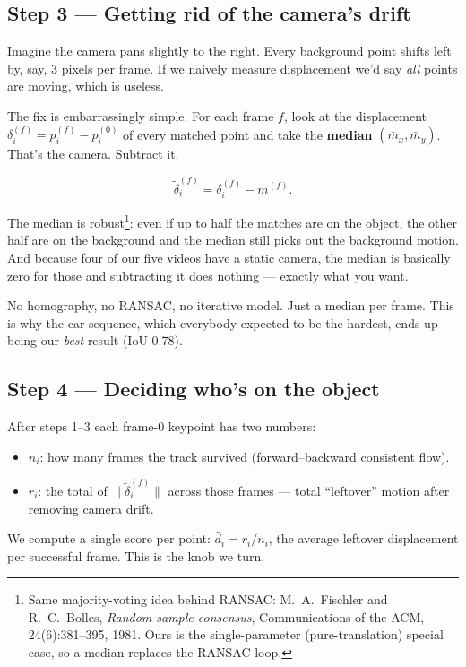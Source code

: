 \documentclass[11pt,a4paper]{article}
\begin{document}
\subsection{Step 3 --- Getting rid of the camera's drift}

Imagine the camera pans slightly to the right. Every background
point shifts left by, say, 3 pixels per frame. If we naively
measure displacement we'd say \emph{all} points are moving, which is
useless.

The fix is embarrassingly simple. For each frame $f$, look at the
displacement $\delta_i^{(f)} = p_i^{(f)} - p_i^{(0)}$ of every
matched point and take the \textbf{median} $(\bar m_x, \bar m_y)$.
That's the camera. Subtract it.

\[
\tilde \delta_i^{(f)} = \delta_i^{(f)} - \bar m^{(f)}.
\]

The median is robust\footnote{Same majority-voting idea behind
RANSAC: M.~A.~Fischler and R.~C.~Bolles, \emph{Random sample
consensus}, Communications of the ACM, 24(6):381--395, 1981.
Ours is the single-parameter (pure-translation) special case, so a
median replaces the RANSAC loop.}: even if up to half the matches are on the
object, the other half are on the background and the median still
picks out the background motion. And because four of our five
videos have a static camera, the median is basically zero for those
and subtracting it does nothing --- exactly what you want.

No homography, no RANSAC, no iterative model. Just a median per
frame. This is why the car sequence, which everybody expected to be
the hardest, ends up being our \emph{best} result (IoU 0.78).

\subsection{Step 4 --- Deciding who's on the object}

After steps 1--3 each frame-0 keypoint has two numbers:

\begin{itemize}\itemsep2pt
\item $n_i$: how many frames the track survived (forward--backward
  consistent flow).
\item $r_i$: the total of $\|\tilde \delta_i^{(f)}\|$ across those
  frames --- total ``leftover'' motion after removing camera drift.
\end{itemize}

We compute a single score per point: $\bar d_i = r_i / n_i$, the
average leftover displacement per successful frame. This is the
knob we turn.
\end{document}

